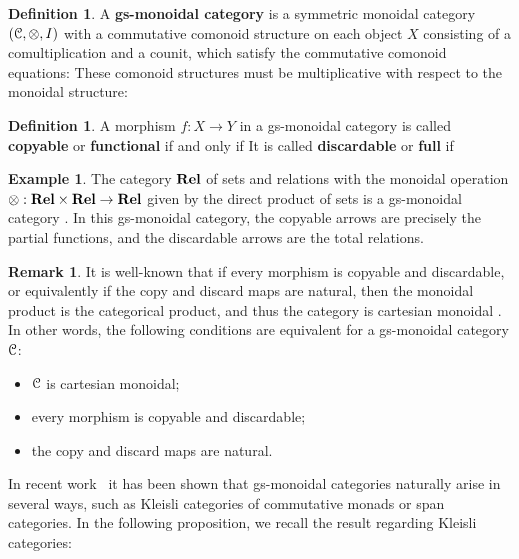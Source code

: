 \documentclass[a4paper,UKenglish,numberwithinsect,cleveref, autoref, thm-restate]{lipics-v2021}
\theoremstyle{plain} %
\theoremstyle{definition} %
\newtheorem{mydefinition}[mytheorem]{Definition}
\newtheorem{myremark}[mytheorem]{Remark}
\newtheorem{myexample}[mytheorem]{Example}
\begin{document}
\begin{mydefinition}
A \textbf{gs-monoidal category} is a symmetric monoidal category $(\mathcal{C}, \otimes, I)$
with a commutative comonoid structure on each object $X$ consisting of a comultiplication
and a counit,
which satisfy the commutative comonoid equations:
These comonoid structures must be multiplicative with respect to the monoidal structure:

\end{mydefinition}


\begin{mydefinition}
 A morphism $f:X\to Y$ in a gs-monoidal category is called \textbf{copyable} or \textbf{functional} if and only if
 It is called \textbf{discardable} or \textbf{full} if 
\end{mydefinition}

\begin{myexample}
The category $\mathbf{Rel}$ of sets and relations with the monoidal operation $\otimes : \mathbf{Rel} \times \mathbf{Rel}\to \mathbf{Rel}$ given by the direct product of sets is a gs-monoidal category \cite{CorradiniGadducci02}. In this gs-monoidal category, the copyable arrows are precisely the partial functions, and the discardable arrows are the total relations.
\end{myexample}

\begin{myremark}
It is well-known that if every morphism is copyable and discardable, or equivalently if the copy and discard maps are natural, then the monoidal product is the categorical product, and thus the category is cartesian monoidal \cite{Fox:CACC}.
In other words, the following conditions are equivalent for a gs-monoidal category $\mathcal{C}$:
 \begin{itemize}
  \item $\mathcal{C}$ is cartesian monoidal;
  \item every morphism is copyable and discardable;
  \item the copy and discard maps are natural.
 \end{itemize}
\end{myremark}

In recent work~\cite{fgtc2022lax} it has been shown that gs-monoidal categories naturally arise in several ways, such as Kleisli categories of commutative monads or span categories. In the following proposition, we recall the result regarding Kleisli categories:
\end{document}

